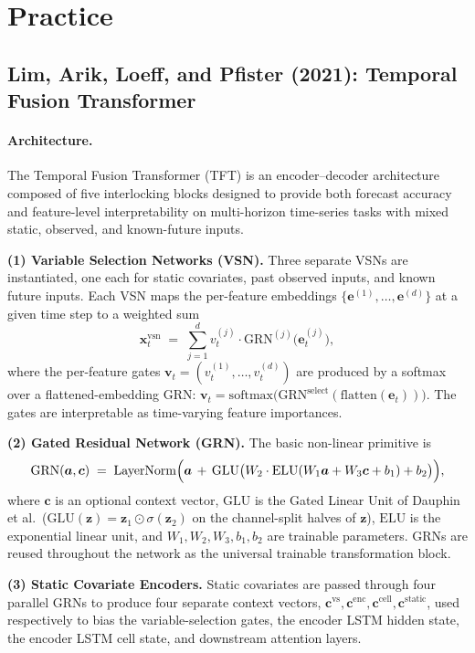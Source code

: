 \documentclass[11pt]{article}
\begin{document}
\section{Practice}

\subsection{Lim, Arik, Loeff, and Pfister (2021): Temporal Fusion Transformer}
\label{sec:tft}

\paragraph{Architecture.}
The Temporal Fusion Transformer (TFT) \cite{lim2021} is an encoder--decoder architecture composed of five interlocking blocks designed to provide both forecast accuracy and feature-level interpretability on multi-horizon time-series tasks with mixed static, observed, and known-future inputs.

\textbf{(1) Variable Selection Networks (VSN).}  Three separate VSNs are instantiated, one each for static covariates, past observed inputs, and known future inputs.  Each VSN maps the per-feature embeddings $\{\bm{e}^{(1)},\dots,\bm{e}^{(d)}\}$ at a given time step to a weighted sum
\[
    \bm{x}_t^{\text{vsn}} \;=\; \sum_{j=1}^{d} v_t^{(j)} \cdot \mathrm{GRN}^{(j)}\!\bigl(\bm{e}_t^{(j)}\bigr),
\]
where the per-feature gates $\bm{v}_t = (v_t^{(1)},\dots,v_t^{(d)})$ are produced by a softmax over a flattened-embedding GRN: $\bm{v}_t = \mathrm{softmax}\bigl(\mathrm{GRN}^{\text{select}}(\mathrm{flatten}(\bm{e}_t))\bigr)$.  The gates are interpretable as time-varying feature importances.

\textbf{(2) Gated Residual Network (GRN).}  The basic non-linear primitive is
\[
    \mathrm{GRN}(\bm{a}, \bm{c}) \;=\; \mathrm{LayerNorm}\Bigl( \bm{a} \,+\, \mathrm{GLU}\bigl( W_2 \cdot \mathrm{ELU}(W_1 \bm{a} + W_3 \bm{c} + b_1) + b_2 \bigr) \Bigr),
\]
where $\bm{c}$ is an optional context vector, $\mathrm{GLU}$ is the Gated Linear Unit of Dauphin et al.\ ($\mathrm{GLU}(\bm{z}) = \bm{z}_1 \odot \sigma(\bm{z}_2)$ on the channel-split halves of $\bm{z}$), $\mathrm{ELU}$ is the exponential linear unit, and $W_1, W_2, W_3, b_1, b_2$ are trainable parameters.  GRNs are reused throughout the network as the universal trainable transformation block.

\textbf{(3) Static Covariate Encoders.}  Static covariates are passed through four parallel GRNs to produce four separate context vectors, $\bm{c}^{\text{vs}}, \bm{c}^{\text{enc}}, \bm{c}^{\text{cell}}, \bm{c}^{\text{static}}$, used respectively to bias the variable-selection gates, the encoder LSTM hidden state, the encoder LSTM cell state, and downstream attention layers.
\end{document}
